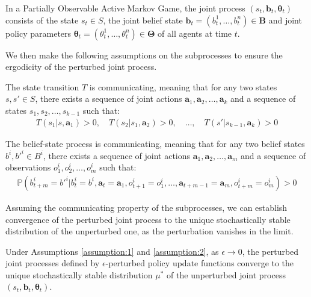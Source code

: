 \begin{definition}
    In a Partially Observable Active Markov Game, the joint process $(s_t, \boldsymbol{b}_t, \boldsymbol{\theta}_t)$ consists of the state $s_t \in S$, the joint belief state $\boldsymbol{b}_t = (b^1_t, \ldots, b^n_t) \in \boldsymbol{B}$ and joint policy parameters $\boldsymbol{\theta}_t = (\theta^1_t, \ldots, \theta^n_t) \in \boldsymbol{\Theta}$ of all agents at time $t$.
\end{definition}
We then make the following assumptions on the subprocesses to ensure the ergodicity of the perturbed joint process.
\begin{assumption}\label{assumption:1}
    The state transition $T$ is communicating, meaning that for any two states $s, s' \in S$, there exists a sequence of joint actions $\boldsymbol{a}_1, \boldsymbol{a}_2, \ldots, \boldsymbol{a}_k$ and a sequence of states $s_1, s_2, \ldots, s_{k-1}$ such that:
    \begin{align}
        T(s_1|s, \boldsymbol{a}_1) > 0, \quad T(s_2|s_1, \boldsymbol{a}_2) > 0, \quad \ldots, \quad T(s'|s_{k-1}, \boldsymbol{a}_k) > 0
    \end{align}
\end{assumption}

\begin{assumption}\label{assumption:2}
    The belief-state process is communicating, meaning that for any two belief states $b^i, b'^i \in B^i$, there exists a sequence of joint actions $\boldsymbol{a}_1, \boldsymbol{a}_2, \ldots, \boldsymbol{a}_m$ and a sequence of observations $o^i_1, o^i_2, \ldots, o^i_m$ such that:
    \begin{align}
        \mathbb{P}(b^i_{t+m} = b'^i | b^i_t = b^i, \boldsymbol{a}_t = \boldsymbol{a}_1, o^i_{t+1} = o^i_1, \ldots, \boldsymbol{a}_{t+m-1} = \boldsymbol{a}_m, o^i_{t+m} = o^i_m) > 0
    \end{align}
\end{assumption}
Assuming the communicating property of the subprocesses, we can establish convergence of the perturbed joint process to the unique stochastically stable distribution of the unperturbed one, as the perturbation vanishes in the limit.
\begin{theorem}
    Under Assumptions \ref{assumption:1} and \ref{assumption:2}, as $\epsilon \to 0$, the perturbed joint processes defined by $\epsilon$-perturbed policy update functions converge to the unique stochastically stable distribution $\mu^*$ of the unperturbed joint process $(s_t, \boldsymbol{b}_t, \boldsymbol{\theta}_t)$.
\end{theorem}


